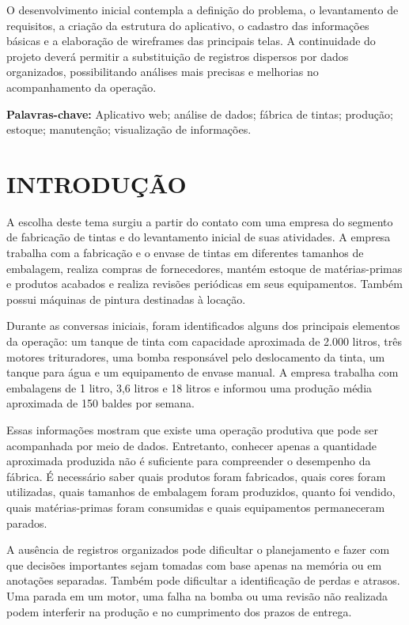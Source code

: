 \documentclass[12pt,a4paper]{article}
\begin{document}
O desenvolvimento inicial contempla a definição do problema, o levantamento de requisitos, a criação da estrutura do aplicativo, o cadastro das informações básicas e a elaboração de wireframes das principais telas. A continuidade do projeto deverá permitir a substituição de registros dispersos por dados organizados, possibilitando análises mais precisas e melhorias no acompanhamento da operação.

\textbf{Palavras-chave:} Aplicativo web; análise de dados; fábrica de tintas; produção; estoque; manutenção; visualização de informações.
\pagebreak

\tableofcontents
\pagebreak

\listoffigures
\pagebreak

\pagestyle{headings}
\setcounter{page}{1}
\newpage
\section{INTRODUÇÃO}
A escolha deste tema surgiu a partir do contato com uma empresa do segmento de fabricação de tintas e do levantamento inicial de suas atividades. A empresa trabalha com a fabricação e o envase de tintas em diferentes tamanhos de embalagem, realiza compras de fornecedores, mantém estoque de matérias-primas e produtos acabados e realiza revisões periódicas em seus equipamentos. Também possui máquinas de pintura destinadas à locação.

Durante as conversas iniciais, foram identificados alguns dos principais elementos da operação: um tanque de tinta com capacidade aproximada de 2.000 litros, três motores trituradores, uma bomba responsável pelo deslocamento da tinta, um tanque para água e um equipamento de envase manual. A empresa trabalha com embalagens de 1 litro, 3,6 litros e 18 litros e informou uma produção média aproximada de 150 baldes por semana.

Essas informações mostram que existe uma operação produtiva que pode ser acompanhada por meio de dados. Entretanto, conhecer apenas a quantidade aproximada produzida não é suficiente para compreender o desempenho da fábrica. É necessário saber quais produtos foram fabricados, quais cores foram utilizadas, quais tamanhos de embalagem foram produzidos, quanto foi vendido, quais matérias-primas foram consumidas e quais equipamentos permaneceram parados.

A ausência de registros organizados pode dificultar o planejamento e fazer com que decisões importantes sejam tomadas com base apenas na memória ou em anotações separadas. Também pode dificultar a identificação de perdas e atrasos. Uma parada em um motor, uma falha na bomba ou uma revisão não realizada podem interferir na produção e no cumprimento dos prazos de entrega.
\end{document}
